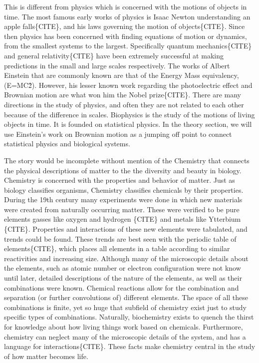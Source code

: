 \documentclass[draft, english]{volcanica-template}
\begin{document}
This is different from physics which is concerned with the motions of objects in time. The most famous early works of physics is Isaac Newton understanding an apple falls\{CITE\}, and his laws governing the motion of objects\{CITE\}. Since then physics has been concerned with finding equations of motion or dynamics, from the smallest systems to the largest. Specifically quantum mechanics\{CITE\} and general relativity\{CITE\} have been extremely successful at making predictions in the small and large scales respectively. The works of Albert Einstein that are commonly known are that of the Energy Mass equivalency, (E=MC\^2). However, his lesser known work regarding the photoelectric effect and Brownian motion are what won him the Nobel prize\{CITE\}. There are many directions in the study of physics, and often they are not related to each other because of the difference in scales. Biophysics is the study of the motions of living objects in time. It is founded on statistical physics. In the theory section, we will use Einstein's work on Brownian motion as a jumping off point to connect statistical physics and biological systems.

The story would be incomplete without mention of the Chemistry that connects the physical descriptions of matter to the the diversity and beauty in biology. Chemistry is concerned with the properties and behavior of matter.
Just as biology classifies organisms, Chemistry classifies chemicals by their properties.  During the 19th century many experiments were done in which new materials were created from naturally occurring matter. These were verified to be pure elements gasses like oxygen and hydrogen \{CITE\} and metals like Ytterbium \{CITE\}.  Properties and interactions of these new elements were tabulated, and trends could be found. These trends are best seen with the periodic table of elements\{CITE\}, which places all elements in a table according to similar reactivities and increasing size. Although many of the microscopic details about the elements, such as atomic number or electron configuration were not know until later, detailed descriptions of the nature of the elements, as well as their combinations were known. Chemical reactions allow for the combination and separation (or further convolutions of) different elements. The space of all these combinations is finite, yet so huge that subfield of chemistry exist just to study specific types of combinations. Naturally, biochemistry exists to quench the thirst for knowledge about how living things work based on chemicals. Furthermore, chemistry can neglect many of the microscopic details of the system, and has a language for interactions\{CITE\}. These facts make chemistry central in the study of how matter becomes life.
\end{document}
